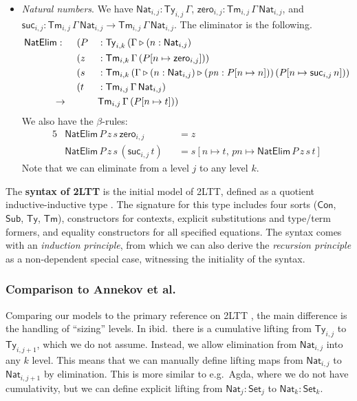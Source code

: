 \documentclass[acmsmall,anonymous,review]{acmart}
\newcommand{\mit}[1]{\mathit{#1}}
\newcommand{\msf}[1]{\mathsf{#1}}
\newcommand{\ext}{\triangleright}
\newcommand{\NatElim}{\msf{NatElim}}
\newcommand{\Con}{\msf{Con}}
\newcommand{\Sub}{\msf{Sub}}
\newcommand{\Ty}{\msf{Ty}}
\newcommand{\Tm}{\msf{Tm}}
\newcommand{\Nat}{\msf{Nat}}
\newcommand{\zero}{\msf{zero}}
\newcommand{\suc}{\msf{suc}}
\newcommand{\Set}{\mathsf{Set}}
\theoremstyle{remark}
\begin{document}
\begin{definition}
\begin{itemize}
\item \emph{Natural numbers}. We have $\Nat_{i,j} : \Ty_{i,j}\,\Gamma$, $\zero_{i,j} : \Tm_{i,j}\,\Gamma\,\Nat_{i,j}$,
  and $\suc_{i,j} : \Tm_{i,j}\,\Gamma\,\Nat_{i,j} \to \Tm_{i,j}\,\Gamma\,\Nat_{i,j}$. The eliminator is the following.
  \begin{alignat*}{5}
    & \NatElim :\hspace{0.5em}
                &&  (P &&: \Ty_{i,k}\,(\Gamma \ext (n : \Nat_{i,j}) \\
    &           &&  (z &&: \Tm_{i,k}\,\Gamma\,(P[n\mapsto \zero_{i,j}])) \\
    &           &&  (s &&: \Tm_{i,k}\,(\Gamma \ext (n : \Nat_{i,j}) \ext (\mit{pn} : P[n\mapsto n]))\,(P[n\mapsto \suc_{i,j}\,n]))\\
    &           &&  (t &&: \Tm_{i,j}\,\Gamma\,\Nat_{i,j}) \\
    &\hspace{3em}\to        &&&& \Tm_{i,j}\,\Gamma\,(P[n\mapsto t]))
  \end{alignat*}
  We also have the $\beta$-rules:
  \begin{alignat*}{5}
    & \NatElim\,P\,z\,s\,\zero_{i,j}     &&= z \\
    & \NatElim\,P\,z\,s\,(\suc_{i,j}\,t) &&= s[n \mapsto t,\,\mit{pn} \mapsto \NatElim\,P\,z\,s\,t]
  \end{alignat*}
  Note that we can eliminate from a level $j$ to any level $k$.
\end{itemize}
\end{definition}

\begin{definition}
The \textbf{syntax of 2LTT} is the initial model of 2LTT, defined as a quotient
inductive-inductive type \cite{kaposi2019constructing}. The signature for this
type includes four sorts ($\Con$, $\Sub$, $\Ty$, $\Tm$), constructors for
contexts, explicit substitutions and type/term formers, and equality
constructors for all specified equations. The syntax comes with an
\emph{induction principle}, from which we can also derive the \emph{recursion principle} as a
non-dependent special case, witnessing the initiality of the syntax.
\end{definition}

\subsubsection{Comparison to Annekov et al.}
Comparing our models to the primary reference on 2LTT \cite{twolevel}, the main
difference is the handling of ``sizing'' levels. In ibid.\ there is a cumulative
lifting from $\Ty_{i,j}$ to $\Ty_{i,j+1}$, which we do not assume. Instead,
we allow elimination from $\Nat_{i,j}$ into any $k$ level. This means that we
can manually define lifting maps from $\Nat_{i,j}$ to $\Nat_{i,j+1}$ by
elimination. This is more similar to e.g.\ Agda, where we do not have cumulativity,
but we can define explicit lifting from $\Nat_j : \Set_j$ to $\Nat_k : \Set_k$.
\end{document}
